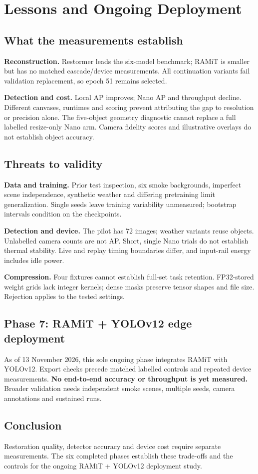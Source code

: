 \section{Lessons and Ongoing Deployment}
\label{sec:discussion}

\subsection{What the measurements establish}
\textbf{Reconstruction.} Restormer leads the six-model benchmark; RAMiT is
smaller but has no matched cascade/device measurements. All continuation
variants fail validation replacement, so epoch 51 remains selected.

\textbf{Detection and cost.} Local AP improves; Nano AP and throughput decline.
Different canvases, runtimes and scoring prevent attributing the gap to
resolution or precision alone. The five-object geometry diagnostic cannot
replace a full labelled resize-only Nano arm. Camera fidelity scores and
illustrative overlays do not establish object accuracy.

\subsection{Threats to validity}
\textbf{Data and training.} Prior test inspection, six smoke backgrounds,
imperfect scene independence, synthetic weather and differing pretraining limit
generalization. Single seeds leave training variability unmeasured; bootstrap
intervals condition on the checkpoints.

\textbf{Detection and device.} The pilot has 72 images; weather variants reuse
objects. Unlabelled camera counts are not AP. Short, single Nano trials do not
establish thermal stability. Live and replay timing boundaries differ, and
input-rail energy includes idle power.

\textbf{Compression.} Four fixtures cannot establish full-set task retention.
FP32-stored weight grids lack integer kernels; dense masks preserve tensor
shapes and file size. Rejection applies to the tested settings.

\subsection{Phase 7: RAMiT + YOLOv12 edge deployment}
\label{sec:ongoing}
As of 13 November 2026, this sole ongoing phase integrates RAMiT with YOLOv12.
Export checks precede matched labelled controls and repeated device measurements.
\textbf{No end-to-end accuracy or throughput is yet measured.} Broader validation
needs independent smoke scenes, multiple seeds, camera annotations and sustained
runs.

\subsection{Conclusion}
Restoration quality, detector accuracy and device cost require separate
measurements. The six completed phases establish these trade-offs and the
controls for the ongoing RAMiT + YOLOv12 deployment study.
